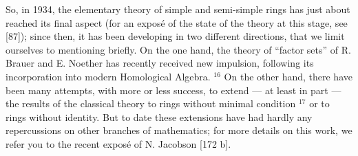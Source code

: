 So, in 1934, the elementary theory of simple and semi-simple rings has just about reached its final aspect (for an exposé of the state of the theory at this stage, see {[}87{]}); since then, it has been developing in two different directions, that we limit ourselves to mentioning briefly. On the one hand, the theory of ``factor sets'' of R. Brauer and E. Noether has recently received new impulsion, following its incorporation into modern Homological Algebra. \(^{16}\) On the other hand, there have been many attempts, with more or less success, to extend --- at least in part --- the results of the classical theory to rings without minimal condition \(^{17}\) or to rings without identity. But to date these extensions have had hardly any repercussions on other branches of mathematics; for more details on this work, we refer you to the recent exposé of N. Jacobson {[}172 b{]}.
